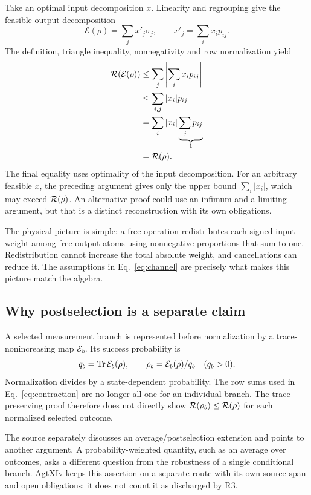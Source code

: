 Take an optimal input decomposition $x$. Linearity and regrouping give the feasible output decomposition
\begin{equation}
  \mathcal{E}(\rho)=\sum_jx'_j\sigma_j,
  \qquad x'_j=\sum_ix_ip_{ij}.
\end{equation}
The definition, triangle inequality, nonnegativity and row normalization yield
\begin{align}
  \mathcal{R}(\mathcal{E}(\rho))
  &\leq\sum_j\left|\sum_ix_ip_{ij}\right|\nonumber\\
  &\leq\sum_{i,j}|x_i|p_{ij}\nonumber\\
  &=\sum_i|x_i|\underbrace{\sum_jp_{ij}}_{1}\nonumber\\
  &=\mathcal{R}(\rho).
  \label{eq:contraction}
\end{align}
The final equality uses optimality of the input decomposition. For an arbitrary feasible $x$, the preceding argument gives only the upper bound $\sum_i|x_i|$, which may exceed $\mathcal{R}(\rho)$. An alternative proof could use an infimum and a limiting argument, but that is a distinct reconstruction with its own obligations.

The physical picture is simple: a free operation redistributes each signed input weight among free output atoms using nonnegative proportions that sum to one. Redistribution cannot increase the total absolute weight, and cancellations can reduce it. The assumptions in Eq.~\eqref{eq:channel} are precisely what makes this picture match the algebra.

\subsection{Why postselection is a separate claim}

A selected measurement branch is represented before normalization by a trace-nonincreasing map $\mathcal{E}_b$. Its success probability is
\begin{equation}
  q_b=\operatorname{Tr}\mathcal{E}_b(\rho),\qquad
  \rho_b=\mathcal{E}_b(\rho)/q_b\quad(q_b>0).
\end{equation}
Normalization divides by a state-dependent probability. The row sums used in Eq.~\eqref{eq:contraction} are no longer all one for an individual branch. The trace-preserving proof therefore does not directly show $\mathcal{R}(\rho_b)\leq\mathcal{R}(\rho)$ for each normalized selected outcome.

The source separately discusses an average/postselection extension and points to another argument. A probability-weighted quantity, such as an average over outcomes, asks a different question from the robustness of a single conditional branch. AgtXIv keeps this assertion on a separate route with its own source span and open obligations; it does not count it as discharged by R3.

